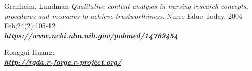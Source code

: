 \documentclass[12pt,a4paper,oneside]{article}
\begin{document}
\begin{thebibliography}{11}
Granheim, Lundman \emph{Qualitative content analysis in nursing research concepts, procedures and measures to achieve trustworthiness.} Nurse Educ Today. 2004 Feb;24(2):105-12 \\\textbf{\emph{\href{https://www.ncbi.nlm.nih.gov/pubmed/14769454}{\url{https://www.ncbi.nlm.nih.gov/pubmed/14769454}}}}


Ronggui Huang; \\\textbf{\emph{\href{http://rqda.r-forge.r-project.org/}{\url{http://rqda.r-forge.r-project.org/}}}}

\end{thebibliography} 
 
\end{document}
